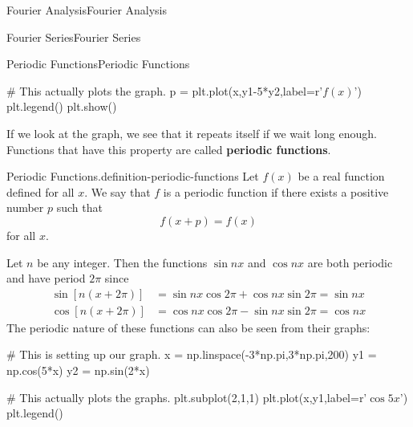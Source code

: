 \documentclass[10pt,]{book}
\newcommand{\terminology}[1]{\textbf{#1}}
\numberwithin{equation}{section}
\begin{document}
\begin{chapterptx}{Fourier Analysis}{}{Fourier Analysis}{}{}
\begin{sectionptx}{Fourier Series}{}{Fourier Series}{}{}
\begin{subsectionptx}{Periodic Functions}{}{Periodic Functions}{}{}
\begin{sageinput}
# This actually plots the graph.
p = plt.plot(x,y1-5*y2,label=r'$f(x)$')
plt.legend()
plt.show()
\end{sageinput}
\hypertarget{p-379}{}%
If we look at the graph, we see that it repeats itself if we wait long enough. Functions that have this property are called \terminology{periodic functions}.%
\begin{definition}{Periodic Functions.}{definition-periodic-functions}%
\hypertarget{p-380}{}%
Let \(f(x)\) be a real function defined for all \(x\). We say that \(f\) is a periodic function if there exists a positive number \(p\) such that%
\begin{equation*}
f(x+p) = f(x)
\end{equation*}
for all \(x\).%
\end{definition}
 \hypertarget{p-381}{}%
Let \(n\) be any integer. Then the functions \(\sin nx\) and \(\cos nx\) are both periodic and have period \(2\pi\) since%
\begin{align*}
\sin[n(x+2\pi)] & = \sin nx\cos2\pi + \cos nx\sin2\pi = \sin nx \\
\cos[n(x+2\pi)] & = \cos nx\cos2\pi - \sin nx\sin2\pi = \cos nx 
\end{align*}
The periodic nature of these functions can also be seen from their graphs:%
 \begin{sageinput}
# This is setting up our graph.
x = np.linspace(-3*np.pi,3*np.pi,200)
y1 = np.cos(5*x)
y2 = np.sin(2*x)

# This actually plots the graphs.
plt.subplot(2,1,1)
plt.plot(x,y1,label=r'$\cos5x$')
plt.legend()


\end{sageinput}
\end{subsectionptx}
\end{sectionptx}
\end{chapterptx}
\end{document}
